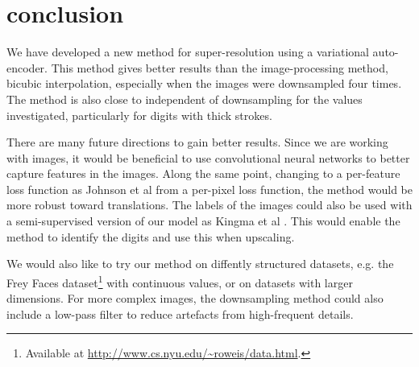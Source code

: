 \section{conclusion}
\label{sec:conclusion}

We have developed a new method for super-resolution using a variational auto-encoder.
This method gives better results than the image-processing method, bicubic interpolation, especially when the images were downsampled four times.
The method is also close to independent of downsampling for the values investigated, particularly for digits with thick strokes.

There are many future directions to gain better results.
Since we are working with images, it would be beneficial to use convolutional neural networks to better capture features in the images.
Along the same point, changing to a per-feature loss function as Johnson et al \cite{Johnson16} from a per-pixel loss function, the method would be more robust toward  translations.
The labels of the images could also be used with a semi-supervised version of our model as Kingma et al \cite{Kingma2014}. This would enable the method to identify the digits and use this when upscaling.

We would also like to try our method on diffently structured datasets, e.g. the Frey Faces dataset\footnote{Available at \url{http://www.cs.nyu.edu/~roweis/data.html}.} with continuous values, or on datasets with larger dimensions.
For more complex images, the downsampling method could also include a low-pass filter to reduce artefacts from high-frequent details.
